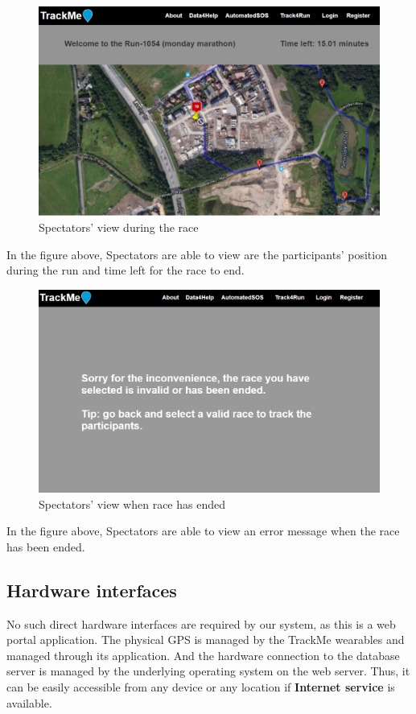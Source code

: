 \documentclass[hidelinks, 12pt]{report}
\begin{document}
	\begin{figure}[H]
		\centering
		\includegraphics[scale=0.35]{../Assets/spectators_valid_race.png}\caption[UI: Spectators' view during the race]{Spectators' view during the race}
		\label{fig:Make_Request}
	\end{figure}
	In the figure above, Spectators are able to view are the participants' position during the run and time left for the race to end. 
	\begin{figure}[H]
		\centering
		\includegraphics[scale=0.35]{../Assets/spectators_invalid_race.png}\caption[UI: Spectators' view when race has ended]{Spectators' view when race has ended}
		\label{fig:Make_Request}
	\end{figure}
	In the figure above, Spectators are able to view an error message when the race has been ended. 
	

	\subsection{Hardware interfaces}
	No such direct hardware interfaces are required by our system, as this is a web portal application. The physical GPS is managed by the TrackMe wearables and managed through its application. And the hardware connection to the database server is managed by the underlying operating system on the web server. Thus, it can be easily accessible from any device or any location if \textbf{Internet service} is available.
	
\end{document}
